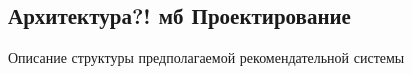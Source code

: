 \subsection{Архитектура?! мб Проектирование}
    Описание структуры предполагаемой рекомендательной системы